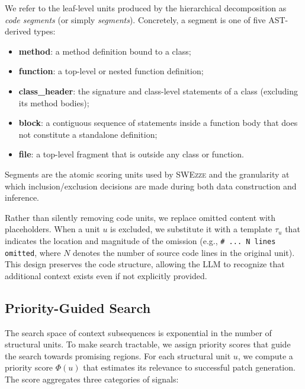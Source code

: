 \documentclass[sigconf,nonacm]{acmart}
\newcommand{\projName}{\textsc{SWEzze}\xspace}
\begin{document}

We refer to the leaf-level units produced by the hierarchical decomposition as \textit{code segments} (or simply \textit{segments}). Concretely, a segment is one of five AST-derived types:
\begin{itemize}
    \item \textbf{method}: a method definition bound to a class;
    \item \textbf{function}: a top-level or nested function definition;
    \item \textbf{class\_header}: the signature and class-level statements of a class (excluding its method bodies);
    \item \textbf{block}: a contiguous sequence of statements inside a function body that does not constitute a standalone definition;
    \item \textbf{file}: a top-level fragment that is outside any class or function.
\end{itemize}
Segments are the atomic scoring units used by \projName and the granularity at which inclusion/exclusion decisions are made during both data construction and inference.

Rather than silently removing code units, we replace omitted content with placeholders. When a unit $u$ is excluded, we substitute it with a template $\tau_u$ that indicates the location and magnitude of the omission (e.g., \texttt{\# ... N lines omitted}, where $N$ denotes the number of source code lines in the original unit). This design preserves the code structure, allowing the LLM to recognize that additional context exists even if not explicitly provided.

\subsection{Priority-Guided Search}
\label{sec:priority}

The search space of context subsequences is exponential in the number of structural units. To make search tractable, we assign priority scores that guide the search towards promising regions. For each structural unit $u$, we compute a priority score $\Phi(u)$ that estimates its relevance to successful patch generation. The score aggregates three categories of signals:
\end{document}
